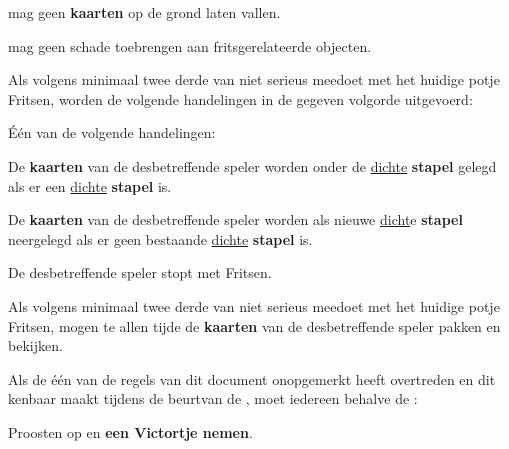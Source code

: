 \vervolgLijst{}
\item \EenSpeler mag geen \textbf{kaarten} op de grond laten vallen.
\eindLijst{}

\vervolgLijst{}
\item \EenSpeler mag geen schade toebrengen aan fritsgerelateerde objecten.
\eindLijst{}



\vervolgLijst{}
\item Als \eenSpeler volgens minimaal twee derde van \alleSpelers niet serieus meedoet met het huidige potje Fritsen, worden de volgende handelingen in de gegeven volgorde uitgevoerd:
\numeriekeLijst{}
\item Één van de volgende handelingen:
\puntLijst{}
\item De \textbf{kaarten} van de desbetreffende speler worden onder de \ul{dichte} \textbf{stapel} gelegd als er een \ul{dichte} \textbf{stapel} is.
\item De \textbf{kaarten} van de desbetreffende speler worden als nieuwe \ul{dicht}e \textbf{stapel} neergelegd als er geen bestaande \ul{dichte} \textbf{stapel} is.
\eindPuntLijst{}
\item De desbetreffende speler stopt met Fritsen.
\eindNumeriekeLijst{}
\eindLijst{}

\vervolgLijst{}
\item Als \eenSpeler volgens minimaal twee derde van \alleSpelers niet serieus meedoet met het huidige potje Fritsen, mogen \alleSpelers te allen tijde de \textbf{kaarten} van de desbetreffende speler pakken en bekijken.
\eindLijst{}


\vervolgLijst{}
\item Als de \vorigeSpeler één van de regels van dit document onopgemerkt heeft overtreden en dit kenbaar maakt tijdens de beurt\footnotemark[1] van de \huidigeSpelerN, moet iedereen behalve de \vorigeSpelerN:
\puntLijst{}
\item Proosten op  en \textbf{een Victortje nemen}\footnotemark[2].
\eindPuntLijst{}
\eindLijst{}


